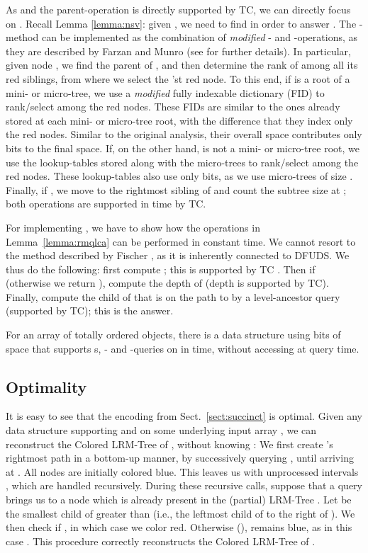 \documentclass[11pt,onecolumn,final]{article} \usepackage{a4}
\theoremstyle{plain}
\theoremstyle{remark}
\begin{document}
As  and the parent-operation is directly supported by TC, we can directly focus on . Recall Lemma \ref{lemma:nsv}: given , we need to find  in order to answer . The -method can be implemented as the combination of \emph{modified} - and -operations, as they are described by Farzan and Munro \cite{farzan08uniform} (see \cite[p.~23]{farzan09phd} for further details). In particular, given node , we find the parent  of , and then determine the rank  of  among all its red siblings, from where we select the 'st red node. To this end, if  is a root of a mini- or micro-tree, we use a \emph{modified} fully indexable dictionary (FID) \cite{raman02succinct} to rank/select among the red nodes. These FIDs are similar to the ones already stored at each mini- or micro-tree root, with the difference that they index only the red nodes. Similar to the original analysis, their overall space contributes only  bits to the final space. If, on the other hand,  is not a mini- or micro-tree root, we use the lookup-tables stored along with the micro-trees to rank/select among the red nodes. These lookup-tables also use only  bits, as we use micro-trees of size . Finally, if , we move to the rightmost sibling  of  and count the subtree size at ; both operations are supported in  time by TC.

For implementing , we have to show how the operations in Lemma~\ref{lemma:rmqlca} can be performed in constant time. We cannot resort to the method described by Fischer \cite{fischer10optimal}, as it is inherently connected to DFUDS. We thus do the following: first compute ; this is supported by TC \cite{geary06succinct,he07succinct}. Then if  (otherwise we return ), compute the depth  of  (depth is supported by TC). Finally, compute the child of  that is on the path to  by a level-ancestor query  (supported by TC); this is the answer.

\begin{theorem}
  \label{thm:main1}
  For an array of  totally ordered objects, there is a data structure using  bits of space that supports s, - and -queries on  in  time, without accessing  at query time.
\end{theorem}

\subsection{Optimality}
It is easy to see that the encoding from Sect.~\ref{sect:succinct} is optimal. Given any data structure  supporting  and  on some underlying input array , we can reconstruct the Colored LRM-Tree  of , without knowing : We first create 's rightmost path  in a bottom-up manner, by successively querying , until arriving at . All nodes are initially colored blue. This leaves us with unprocessed intervals , which are handled recursively. During these recursive calls, suppose that a query  brings us to a node  which is already present in the (partial) LRM-Tree . Let  be the smallest child of  greater than  (i.e., the leftmost child of  to the right of ). We then check if , in which case we color  red. Otherwise (),  remains blue, as in this case . This procedure correctly reconstructs the Colored LRM-Tree  of .
\end{document}
